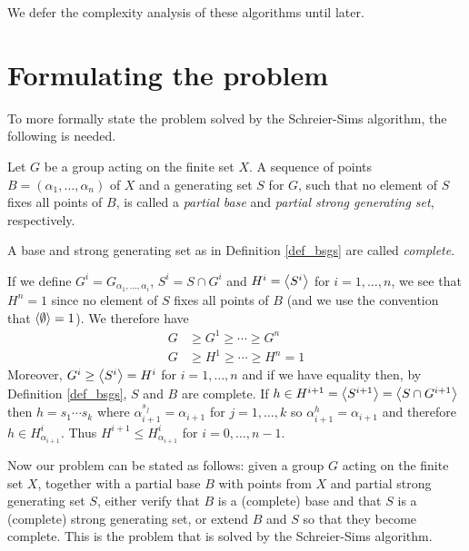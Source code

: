 We defer the complexity analysis of these algorithms until later.

\section{Formulating the problem}
To more formally state the problem solved by the Schreier-Sims algorithm, the following is needed.
\begin{deff}
  Let $G$ be a group acting on the finite set $X$. A sequence of points
  $B = (\alpha_1, \dotsc, \alpha_n)$ of $X$ and a generating set $S$ for $G$, such that no element of $S$ fixes all points of $B$, is called a \emph{partial base} and \emph{partial strong generating set}, respectively. 
\end{deff}
\begin{remark}
A base and strong generating set as in Definition \ref{def_bsgs} are called \emph{complete}.
\end{remark}
\begin{remark} \label{rmk_partial_bsgs}
  If we define $G^i = G_{\alpha_1, \dotsc, \alpha_i}$, $S^i = S \cap
  G^i$ and $H^i = \left\langle S^i \right\rangle$ for $i = 1, \dotsc, n$, we see that $H^n
  = 1$ since no element of $S$ fixes all points of $B$ (and we use the
  convention that $\left\langle \emptyset \right\rangle = 1$). We therefore have
\begin{align}
G & \geq G^1 \geq \dotsb \geq G^n \\
G & \geq H^1 \geq \dotsb \geq H^n = 1 
\end{align}
Moreover, $G^i \geq \left\langle S^i \right\rangle = H^i$ for $i = 1, \dotsc, n$ and if we
have equality then, by Definition \ref{def_bsgs}, $S$ and $B$ are complete. If $h
\in H^{i + 1} = \left\langle S^{i + 1} \right\rangle = \left\langle S \cap G^{i + 1} \right\rangle$ then $h = s_1 \dotsm s_k$ where $\alpha_{i + 1}^{s_j} = \alpha_{i + 1}$ for $j = 1, \dotsc, k$ so $\alpha_{i + 1}^h = \alpha_{i + 1}$ and therefore $h \in H^i_{\alpha_{i + 1}}$. Thus $H^{i + 1} \leq H^i_{\alpha_{i + 1}}$ for $i = 0, \dotsc, n - 1$.
\end{remark}

Now our problem can be stated as follows: given a group $G$ acting on the
finite set $X$, together with a partial base $B$ with points from $X$
and partial strong generating set $S$, either verify that $B$ is a
(complete) base and that $S$ is a (complete) strong generating set, or
extend $B$ and $S$ so that they become complete. This is the problem that is
solved by the Schreier-Sims algorithm.


